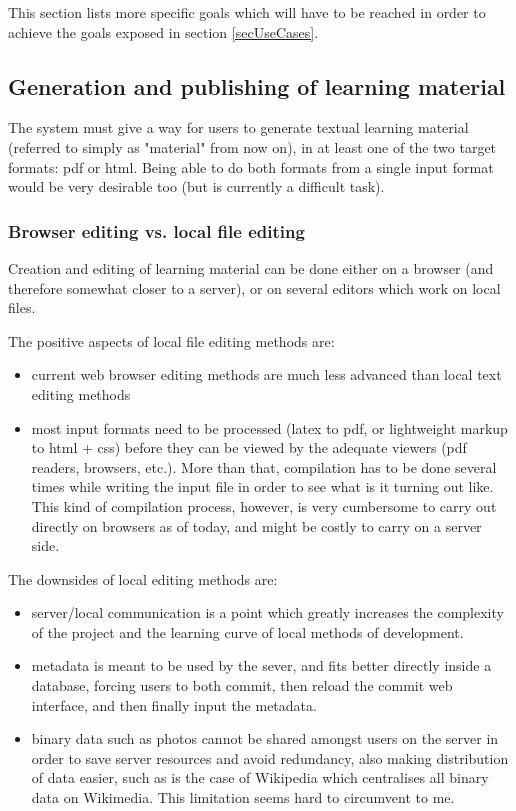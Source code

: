 \documentclass[12pt]{article}
\begin{document}
This section lists more specific goals which will have to be reached in order to achieve the goals exposed in section \ref{secUseCases}.

\subsection{Generation and publishing of learning material}

The system must give a way for users to generate textual learning material (referred to simply as "material" from now on), in at least one of the two target formats: pdf or html. Being able to do both formats from a single input format would be very desirable too (but is currently a difficult task).

\subsubsection{Browser editing vs. local file editing}

Creation and editing of learning material can be done either on a browser (and therefore somewhat closer to a server), or on several editors which work on local files.

  The positive aspects of local file editing methods are:
  \begin{itemize}
    \item current web browser editing methods are much less advanced than local text editing methods
    \item most input formats need to be processed (latex to pdf, or lightweight markup to html + css) before they can be viewed by the adequate viewers (pdf readers, browsers, etc.). More than that, compilation has to be done several times while writing the input file in order to see what is it turning out like. This kind of compilation process, however, is very cumbersome to carry out directly on browsers as of today, and might be costly to carry on a server side.
  \end{itemize}    
  
  The downsides of local editing methods are:
  \begin{itemize}
    \item server/local communication is a point which greatly increases the complexity of the project and the learning curve of local methods of development.
    
    \item metadata is meant to be used by the sever, and fits better directly inside a database, forcing users to both commit, then reload the commit web interface, and then finally input the metadata.
    
    \item binary data such as photos cannot be shared amongst users on the server in order to save server resources and avoid redundancy, also making distribution of data easier, such as is the case of Wikipedia which centralises all binary data on Wikimedia. This limitation seems hard to circumvent to me.
  \end{itemize}
  
\end{document}
